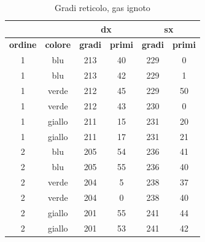 \documentclass[letterpaper,12pt]{article}
\begin{document}
            \begin{table}[h!]
                \centering
                \begin{tabular}{|c|c|cc|cc|}
                \hline
                & & \multicolumn{2}{|c|}{\textbf{dx}} & \multicolumn{2}{|c|}{\textbf{sx}} \\
                \hline
                \textbf{ordine} & \textbf{colore} & \textbf{gradi} & \textbf{primi} & \textbf{gradi} & \textbf{primi} \\
                \hline
                1 & blu & 213 & 40 & 229 & 0 \\
                1 & blu & 213 & 42 & 229 & 1 \\
                1 & verde & 212 & 45 & 229 & 50 \\
                1 & verde & 212 & 43 & 230 & 0 \\
                1 & giallo & 211 & 15 & 231 & 20 \\
                1 & giallo & 211 & 17 & 231 & 21 \\
                2 & blu & 205 & 54 & 236 & 41 \\
                2 & blu & 205 & 55 & 236 & 40 \\
                2 & verde & 204 & 5 & 238 & 37 \\
                2 & verde & 204 & 0 & 238 & 40 \\
                2 & giallo & 201 & 55 & 241 & 44 \\
                2 & giallo & 201 & 53 & 241 & 42 \\
                \hline
                \end{tabular}
                \caption{Gradi reticolo, gas ignoto}
                \label{tab:dati_reticolo_ignoto}
                \end{table}
\end{document}
